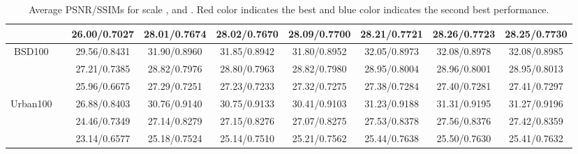 \documentclass[10pt,twocolumn,letterpaper]{article}
\begin{document}
\begin{table*}[htp]
\begin{center}
\begin{tabular}{|c|c|c|c|c|c|c|c||c|}
			&  & 26.00/0.7027 & 28.01/0.7674 & 28.02/0.7670 & 28.09/0.7700 & 28.21/0.7721 & \textcolor[rgb]{1.00,0.00,0.00}{28.26}/\textcolor[rgb]{0.00,0.07,1.00}{0.7723} & \textcolor[rgb]{0.00,0.07,1.00}{28.25}/\textcolor[rgb]{1.00,0.00,0.00}{0.7730} \\
			
			\hline
			\hline
			\multirow{3}{*}{BSD100} &  & 29.56/0.8431 & 31.90/0.8960 & 31.85/0.8942 & 31.80/0.8952 & \textcolor[rgb]{0.00,0.07,1.00}{32.05}/0.8973 & \textcolor[rgb]{1.00,0.00,0.00}{32.08}/\textcolor[rgb]{0.00,0.07,1.00}{0.8978} & \textcolor[rgb]{1.00,0.00,0.00}{32.08}/\textcolor[rgb]{1.00,0.00,0.00}{0.8985} \\
			
			&  & 27.21/0.7385 & 28.82/0.7976 & 28.80/0.7963 & 28.82/0.7980 & \textcolor[rgb]{0.00,0.07,1.00}{28.95}/\textcolor[rgb]{0.00,0.07,1.00}{0.8004} & \textcolor[rgb]{1.00,0.00,0.00}{28.96}/0.8001 & \textcolor[rgb]{0.00,0.07,1.00}{28.95}/\textcolor[rgb]{1.00,0.00,0.00}{0.8013} \\
			
			&  & 25.96/0.6675 & 27.29/0.7251 & 27.23/0.7233 & 27.32/0.7275 & 27.38/\textcolor[rgb]{0.00,0.07,1.00}{0.7284} & \textcolor[rgb]{0.00,0.07,1.00}{27.40}/0.7281 & \textcolor[rgb]{1.00,0.00,0.00}{27.41}/\textcolor[rgb]{1.00,0.00,0.00}{0.7297} \\
			
			\hline
			\hline
			
			\multirow{3}{*}{Urban100} &  & 26.88/0.8403 & 30.76/0.9140 & 30.75/0.9133 & 30.41/0.9103 & 31.23/0.9188 & \textcolor[rgb]{1.00,0.00,0.00}{31.31}/\textcolor[rgb]{0.00,0.07,1.00}{0.9195} & \textcolor[rgb]{0.00,0.07,1.00}{31.27}/\textcolor[rgb]{1.00,0.00,0.00}{0.9196} \\
			
			&  & 24.46/0.7349 & 27.14/0.8279 & 27.15/0.8276 & 27.07/0.8275 & \textcolor[rgb]{0.00,0.07,1.00}{27.53}/\textcolor[rgb]{1.00,0.00,0.00}{0.8378} & \textcolor[rgb]{1.00,0.00,0.00}{27.56}/\textcolor[rgb]{0.00,0.07,1.00}{0.8376} & 27.42/0.8359 \\
			
			&  & 23.14/0.6577 & 25.18/0.7524 & 25.14/0.7510 & 25.21/0.7562 & \textcolor[rgb]{0.00,0.07,1.00}{25.44}/\textcolor[rgb]{1.00,0.00,0.00}{0.7638} & \textcolor[rgb]{1.00,0.00,0.00}{25.50}/0.7630 & 25.41/\textcolor[rgb]{0.00,0.07,1.00}{0.7632} \\
			
			\hline
			
		\end{tabular}
	\end{center}
	\caption{Average PSNR/SSIMs for scale ,  and . Red color indicates the best and blue color indicates the second best performance.}
	\label{tab:psnr/ssim}
\end{table*}
\end{document}
